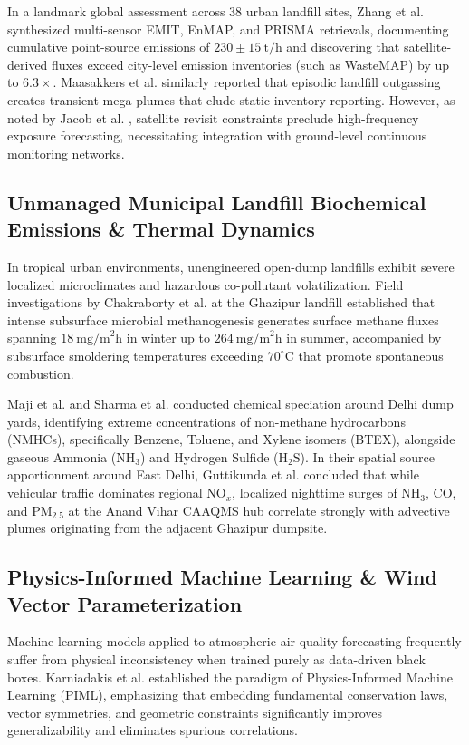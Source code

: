 \documentclass[conference]{IEEEtran}
\begin{document}
In a landmark global assessment across 38 urban landfill sites, Zhang et al. \cite{zhang2025global} synthesized multi-sensor EMIT, EnMAP, and PRISMA retrievals, documenting cumulative point-source emissions of $230 \pm 15\ \text{t/h}$ and discovering that satellite-derived fluxes exceed city-level emission inventories (such as WasteMAP) by up to $6.3\times$. Maasakkers et al. \cite{maasakkers2022using} similarly reported that episodic landfill outgassing creates transient mega-plumes that elude static inventory reporting. However, as noted by Jacob et al. \cite{jacob2022quantifying}, satellite revisit constraints preclude high-frequency exposure forecasting, necessitating integration with ground-level continuous monitoring networks.

\subsection{Unmanaged Municipal Landfill Biochemical Emissions \& Thermal Dynamics}
In tropical urban environments, unengineered open-dump landfills exhibit severe localized microclimates and hazardous co-pollutant volatilization. Field investigations by Chakraborty et al. \cite{chakraborty2022methane} at the Ghazipur landfill established that intense subsurface microbial methanogenesis generates surface methane fluxes spanning $18\ \text{mg/m}^2\text{h}$ in winter up to $264\ \text{mg/m}^2\text{h}$ in summer, accompanied by subsurface smoldering temperatures exceeding $70^\circ\text{C}$ that promote spontaneous combustion. 

Maji et al. \cite{maji2021volatile} and Sharma et al. \cite{sharma2022variation} conducted chemical speciation around Delhi dump yards, identifying extreme concentrations of non-methane hydrocarbons (NMHCs), specifically Benzene, Toluene, and Xylene isomers (BTEX), alongside gaseous Ammonia ($\text{NH}_3$) and Hydrogen Sulfide ($\text{H}_2\text{S}$). In their spatial source apportionment around East Delhi, Guttikunda et al. \cite{guttikunda2019air} concluded that while vehicular traffic dominates regional $\text{NO}_x$, localized nighttime surges of $\text{NH}_3$, $\text{CO}$, and $\text{PM}_{2.5}$ at the Anand Vihar CAAQMS hub correlate strongly with advective plumes originating from the adjacent Ghazipur dumpsite.

\subsection{Physics-Informed Machine Learning \& Wind Vector Parameterization}
Machine learning models applied to atmospheric air quality forecasting frequently suffer from physical inconsistency when trained purely as data-driven black boxes. Karniadakis et al. \cite{karniadakis2021physics} established the paradigm of Physics-Informed Machine Learning (PIML), emphasizing that embedding fundamental conservation laws, vector symmetries, and geometric constraints significantly improves generalizability and eliminates spurious correlations. 
\end{document}
